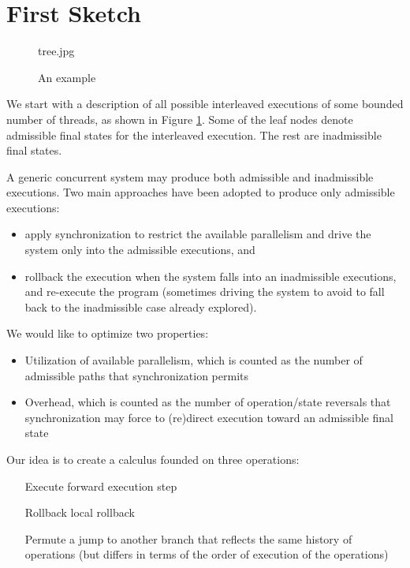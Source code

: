 \section{First Sketch}

\begin{figure}
tree.jpg
\caption{An example}
\label{fig:example}
\end{figure}

We start with a description of all possible interleaved executions of some bounded number of threads, as shown in Figure \ref{fig:example}. Some of the leaf nodes denote admissible final states for the interleaved execution. The rest are inadmissible final states.

A generic concurrent system may produce both admissible and inadmissible executions. Two main approaches have been adopted to produce only admissible executions:
\begin{itemize}
\item apply synchronization to restrict the available parallelism and drive the system only into the admissible executions, and
\item rollback the execution when the system falls into an inadmissible executions, and re-execute the program (sometimes driving the system to avoid to fall back to the inadmissible case already explored).
\end{itemize}

We would like to optimize two properties:
\begin{itemize}
\item Utilization of available parallelism, which is counted as the number of admissible paths that synchronization permits
\item Overhead, which is counted as the number of operation/state reversals that synchronization may force to (re)direct execution toward an admissible final state
\end{itemize}




Our idea is to create a calculus founded on three operations:
\begin{itemize}
\item[Execute] forward execution step
\item[Rollback] local rollback
\item[Permute] a jump to another branch that reflects the same history of operations (but differs in terms of the order of execution of the operations)
\end{itemize}

